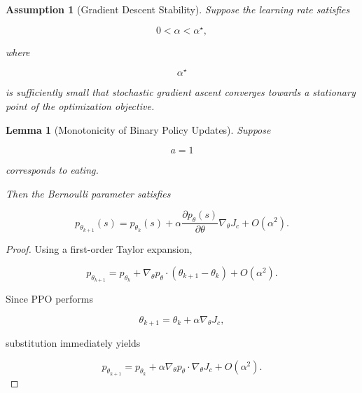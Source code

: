 \documentclass[11pt]{article}
\newtheorem{assumption}{Assumption}
\newtheorem{lemma}{Lemma}
\begin{document}

\begin{assumption}[Gradient Descent Stability]

Suppose the learning rate satisfies

\[
0<\alpha<\alpha^\star,
\]

where

\[
\alpha^\star
\]

is sufficiently small that stochastic gradient ascent converges
towards a stationary point of the optimization objective.

\end{assumption}


\begin{lemma}[Monotonicity of Binary Policy Updates]

Suppose

\[
a=1
\]

corresponds to eating.

Then the Bernoulli parameter satisfies

\[
p_{\theta_{k+1}}(s)
=
p_{\theta_k}(s)
+
\alpha
\frac{\partial p_\theta(s)}
{\partial\theta}
\nabla_\theta J_c
+
O(\alpha^2).
\]

\end{lemma}

\begin{proof}

Using a first-order Taylor expansion,

\[
p_{\theta_{k+1}}
=
p_{\theta_k}
+
\nabla_\theta p_\theta
\cdot
(\theta_{k+1}-\theta_k)
+
O(\alpha^2).
\]

Since PPO performs

\[
\theta_{k+1}
=
\theta_k
+
\alpha
\nabla_\theta J_c,
\]

substitution immediately yields

\[
p_{\theta_{k+1}}
=
p_{\theta_k}
+
\alpha
\nabla_\theta p_\theta
\cdot
\nabla_\theta J_c
+
O(\alpha^2).
\]

\end{proof}

\end{document}
